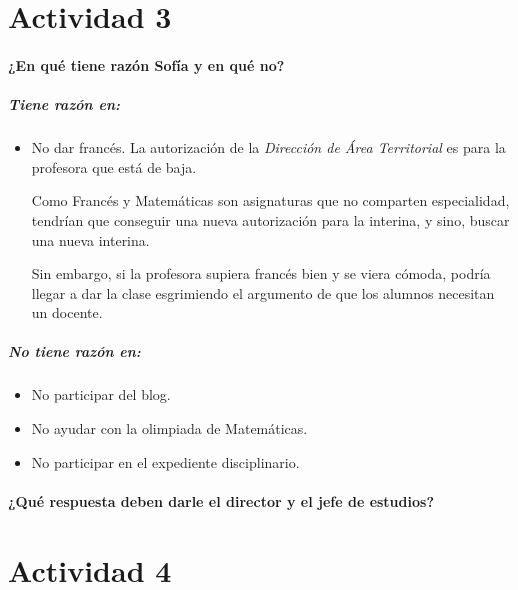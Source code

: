 \section{Actividad 3}


\paragraph{¿En qué tiene razón Sofía y en qué no?}

\subparagraph{Tiene razón en:}

\begin{itemize}
	\item No dar francés.
 La autorización de la \textit{Dirección de Área Territorial} es para la profesora que está de baja.
 
	Como Francés y Matemáticas son asignaturas que no comparten especialidad, tendrían que conseguir una nueva autorización para la interina, y sino, buscar una nueva interina.


	Sin embargo, si la profesora supiera francés bien y se viera cómoda, podría llegar a dar la clase esgrimiendo el argumento de que los alumnos necesitan un docente.

\end{itemize}


\subparagraph{No tiene razón en:}

\begin{itemize}
	\item No participar del blog.

	\item No ayudar con la olimpiada de Matemáticas.

	\item No participar en el expediente disciplinario.

\end{itemize}


\paragraph{¿Qué respuesta deben darle el director y el jefe de estudios?}



\section{Actividad 4}


